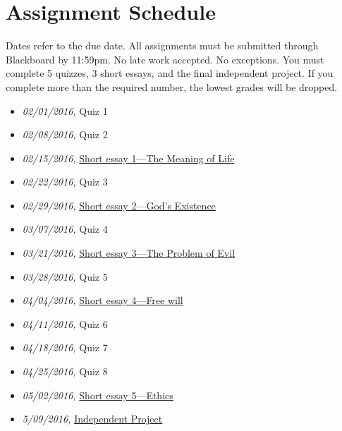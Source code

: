 \documentclass[article,oneside]{memoir}
\begin{document}
\section{ Assignment Schedule}
Dates refer to the due date. All assignments must be submitted through Blackboard by 11:59pm. No late work accepted. No exceptions. You must complete 5 quizzes, 3 short essays, and the final independent project. If you complete more than the required number, the lowest grades will be dropped.
\begin{itemize}
\item \textit{02/01/2016,} Quiz 1 
\item \textit{02/08/2016,} Quiz 2 
\item \textit{02/15/2016,} \href{http://scoconno.github.io/Teaching/Examined/Meaning/SW1/}{Short essay 1---The Meaning of Life} 
\item \textit{02/22/2016,} Quiz 3 
\item \textit{02/29/2016,} \href{http://scoconno.github.io/Teaching/Examined/God/SW2/}{Short essay 2---God's Existence}
\item \textit{03/07/2016,} Quiz 4
\item \textit{03/21/2016,}  \href{http://scoconno.github.io/Teaching/Examined/God/Essay1}{Short essay 3---The Problem of Evil}
\item \textit{03/28/2016,} Quiz 5 
\item \textit{04/04/2016,}  \href{http://scoconno.github.io/Teaching/Examined/FreeWill/Essay/}{Short essay 4---Free will}
\item \textit{04/11/2016,} Quiz 6
\item \textit{04/18/2016,} Quiz 7
\item \textit{04/25/2016,} Quiz 8
\item \textit{05/02/2016,} \href{http://scoconno.github.io/Teaching/Examined/Ethics/Essay/}{Short essay 5---Ethics}
\item \textit{5/09/2016,} \href{http://scoconno.github.io/Teaching/Examined/Applied/Essay/}{Independent Project}
\end{itemize}






\end{document}
